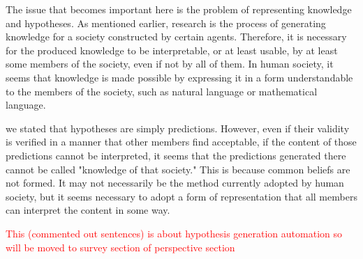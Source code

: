 \documentclass{book}
\begin{document}
The issue that becomes important here is the problem of representing knowledge and hypotheses. As mentioned earlier, research is the process of generating knowledge for a society constructed by certain agents. Therefore, it is necessary for the produced knowledge to be interpretable, or at least usable, by at least some members of the society, even if not by all of them. In human society, it seems that knowledge is made possible by expressing it in a form understandable to the members of the society, such as natural language or mathematical language.

we stated that hypotheses are simply predictions. However, even if their validity is verified in a manner that other members find acceptable, if the content of those predictions cannot be interpreted, it seems that the predictions generated there cannot be called "knowledge of that society." This is because common beliefs are not formed. It may not necessarily be the method currently adopted by human society, but it seems necessary to adopt a form of representation that all members can interpret the content in some way.



\textcolor{red}{This (commented out sentences) is about hypothesis generation automation so will be moved to survey section of perspective section}
\end{document}
